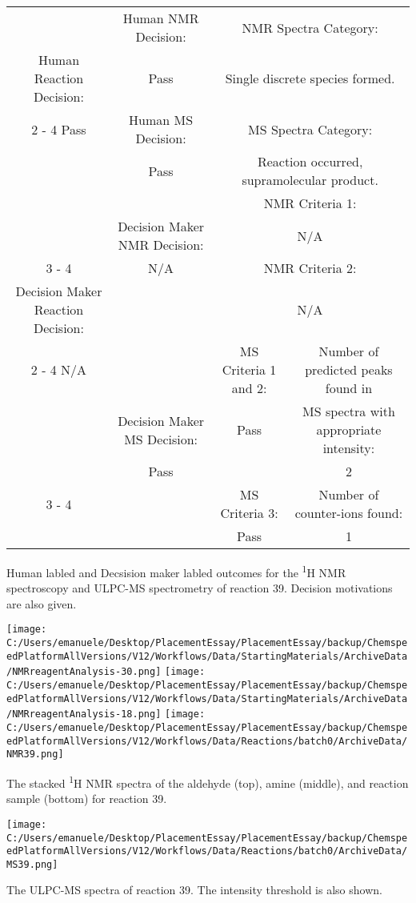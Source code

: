 \documentclass{article}%
\begin{document}
\begin{Decision Table}[H]%
\begin{tabular}{|c|c|c|c|}%
\hline%
&Human NMR Decision:&\multicolumn{2}{|c|}{NMR Spectra Category:}\\%
Human Reaction Decision:&Pass&\multicolumn{2}{|c|}{Single discrete species formed.}\\%
\cline{2%
-%
4}%
Pass&Human MS Decision:&\multicolumn{2}{|c|}{MS Spectra Category:}\\%
&Pass&\multicolumn{2}{|c|}{Reaction occurred, supramolecular product.}\\%
\hline%
&&\multicolumn{2}{|c|}{NMR Criteria 1:}\\%
&Decision Maker NMR Decision:&\multicolumn{2}{|c|}{N/A}\\%
\cline{3%
-%
4}%
&N/A&\multicolumn{2}{|c|}{NMR Criteria 2:}\\%
Decision Maker Reaction Decision:&&\multicolumn{2}{|c|}{N/A}\\%
\cline{2%
-%
4}%
N/A&&MS Criteria 1 and 2:&Number of predicted peaks found in\\%
&Decision Maker MS Decision:&Pass&MS spectra with appropriate intensity:\\%
&Pass&&2\\%
\cline{3%
-%
4}%
&&MS Criteria 3:&Number of counter{-}ions found:\\%
&&Pass&1\\%
\hline%
\end{tabular}%
\caption{Human labled and Decsision maker labled outcomes for the \textsuperscript{1}H NMR spectroscopy and ULPC-MS spectrometry of reaction 39. Decision motivations are also given.}%
\end{Decision Table}%
\begin{NMR Spectra}[H]%
\begin{center}%
\texttt{[image: C:/Users/emanuele/Desktop/PlacementEssay/PlacementEssay/backup/ChemspeedPlatformAllVersions/V12/Workflows/Data/StartingMaterials/ArchiveData/NMRreagentAnalysis-30.png]}\hfill%
\texttt{[image: C:/Users/emanuele/Desktop/PlacementEssay/PlacementEssay/backup/ChemspeedPlatformAllVersions/V12/Workflows/Data/StartingMaterials/ArchiveData/NMRreagentAnalysis-18.png]}\hfill%
\texttt{[image: C:/Users/emanuele/Desktop/PlacementEssay/PlacementEssay/backup/ChemspeedPlatformAllVersions/V12/Workflows/Data/Reactions/batch0/ArchiveData/NMR39.png]}\hfill%
\end{center}%
\caption{The stacked \textsuperscript{1}H NMR spectra of the aldehyde (top), amine (middle), and reaction sample (bottom) for reaction 39.}%
\end{NMR Spectra}%
\begin{MS Spectra}[H]%
\begin{center}%
\texttt{[image: C:/Users/emanuele/Desktop/PlacementEssay/PlacementEssay/backup/ChemspeedPlatformAllVersions/V12/Workflows/Data/Reactions/batch0/ArchiveData/MS39.png]}\hfill%
\end{center}%
\caption{The ULPC-MS spectra of reaction 39. The intensity threshold is also shown.}%
\end{MS Spectra}%
\end{document}
